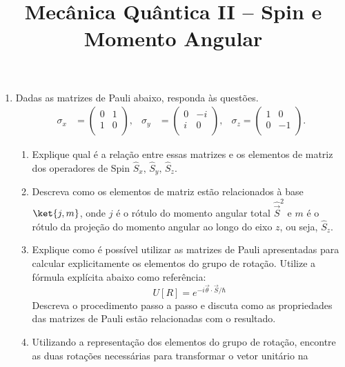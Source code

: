 \newif\ifuseseminar
\useseminartrue


\title{Mecânica Quântica II -- Spin e Momento Angular}


\begin{enumerate}
	\item Dadas as matrizes de Pauli abaixo, responda às questões.
	      \begin{align*}
		      \sigma_x & = \begin{pmatrix}
			                   0 & 1 \\
			                   1 & 0 \\
		                   \end{pmatrix}, &
		      \sigma_y & = \begin{pmatrix}
			                   0 & -i \\
			                   i & 0  \\
		                   \end{pmatrix}, &
		      \sigma_z = \begin{pmatrix}
			                 1 & 0  \\
			                 0 & -1 \\
		                 \end{pmatrix}.
	      \end{align*}
	      \begin{enumerate}
		      \item Explique qual é a relação entre essas matrizes e os elementos de
		            matriz dos operadores de Spin $\hat{S}_x,\,\hat{S}_y,\,\hat{S}_z$.
		      \item Descreva como os elementos de matriz estão relacionados à base
		            $\ket{j,m}$, onde $j$ é o rótulo do momento angular total
		            $\hat{\vec{S}}^2$ e $m$ é o rótulo da projeção do momento angular ao longo
		            do eixo $z$, ou seja, $\hat{S}_z$.
		      \item Explique como é possível utilizar as matrizes de Pauli apresentadas
		            para calcular explicitamente os elementos do grupo de rotação. Utilize a
		            fórmula explícita abaixo como referência:
		            $$ U[R] = e^{-i\vec{\theta}\cdot\vec{S}/\hbar} $$ Descreva o
		            procedimento passo a passo e discuta como as propriedades das
		            matrizes de Pauli estão relacionadas com o resultado.
		      \item Utilizando a representação dos elementos do grupo de rotação,
		            encontre as duas rotações necessárias para transformar o vetor unitário na

\end{enumerate}
\end{enumerate}

